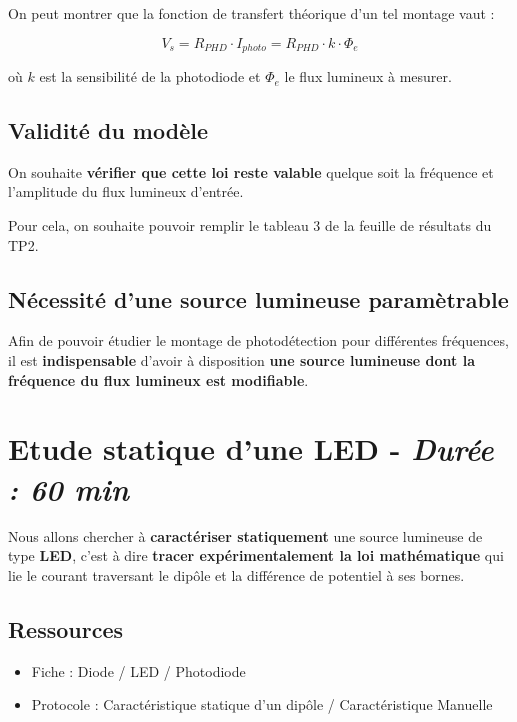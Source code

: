 On peut montrer que la fonction de transfert théorique d'un tel montage vaut :

\[
\boxed{V_s = R_{PHD} \cdot I_{photo} = R_{PHD} \cdot k \cdot \Phi_{e}}
\]

où $k$ est la sensibilité de la photodiode et $\Phi_e$ le flux lumineux à mesurer.

\subsection{Validité du modèle}

On souhaite \textbf{vérifier que cette loi reste valable} quelque soit la fréquence et l'amplitude du flux lumineux d'entrée.

\medskip

Pour cela, on souhaite pouvoir remplir le tableau 3 de la feuille de résultats du TP2.

\bigskip

\subsection{Nécessité d'une source lumineuse paramètrable}

Afin de pouvoir étudier le montage de photodétection pour différentes fréquences, il est \textbf{indispensable} d'avoir à disposition \textbf{une source lumineuse dont la fréquence du flux lumineux est modifiable}.


\clearpage
\section{Etude statique d'une LED - \textit{Durée : 60 min}}

Nous allons chercher à \textbf{caractériser statiquement} une source lumineuse de type \textbf{LED}, c'est à dire \textbf{tracer expérimentalement la loi mathématique} qui lie le courant traversant le dipôle et la différence de potentiel à ses bornes.


\subsection{Ressources}

\begin{itemize}
	\item Fiche : Diode / LED / Photodiode
	\item Protocole : Caractéristique statique d'un dipôle / Caractéristique Manuelle
\end{itemize}

